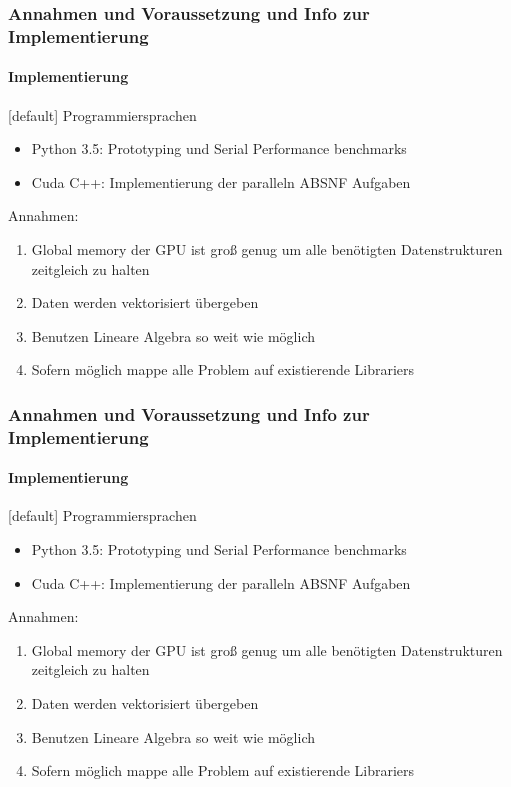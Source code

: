 \begin{frame}
	\frametitle{Annahmen und Voraussetzung und Info zur Implementierung}
	\framesubtitle{Implementierung}
	[default]
	Programmiersprachen
	\begin{itemize}
		\item Python 3.5: Prototyping und Serial Performance benchmarks
		\item Cuda C++: Implementierung der paralleln ABSNF Aufgaben
	\end{itemize}
	
	Annahmen:
	\begin{enumerate}
		\item Global memory der GPU ist groß genug um alle benötigten Datenstrukturen zeitgleich zu halten
		\item Daten werden vektorisiert übergeben
		\item Benutzen Lineare Algebra so weit wie möglich
		\item Sofern möglich mappe alle Problem auf existierende Librariers
	\end{enumerate}
	
\end{frame}
\begin{frame}
	\frametitle{Annahmen und Voraussetzung und Info zur Implementierung}
	\framesubtitle{Implementierung}
	[default]
	Programmiersprachen
	\begin{itemize}
		\item Python 3.5: Prototyping und Serial Performance benchmarks
		\item Cuda C++: Implementierung der paralleln ABSNF Aufgaben
	\end{itemize}
	
	Annahmen:
	\begin{enumerate}
		\item Global memory der GPU ist groß genug um alle benötigten Datenstrukturen zeitgleich zu halten
		\item Daten werden vektorisiert übergeben
		\item Benutzen Lineare Algebra so weit wie möglich
		\item Sofern möglich mappe alle Problem auf existierende Librariers
	\end{enumerate}
	
\end{frame}

